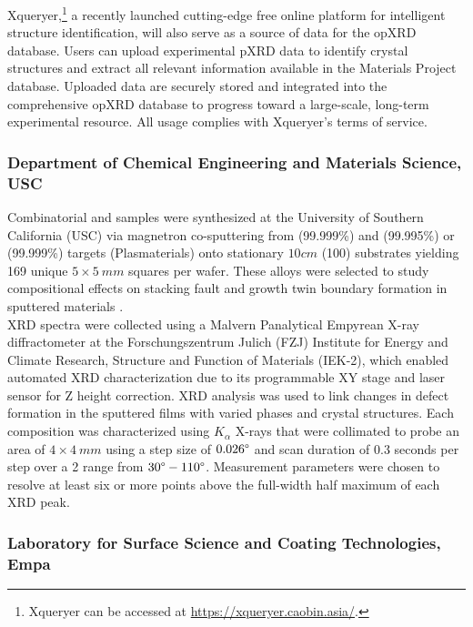 Xqueryer,\footnote{Xqueryer can be accessed at \url{https://xqueryer.caobin.asia/}.} a recently launched cutting-edge free online platform for intelligent structure identification, will also serve as a source of data for the opXRD database. Users can upload experimental pXRD data to identify crystal structures and extract all relevant information available in the Materials Project database\cite{jain2013commentary}. Uploaded data are securely stored and integrated into the comprehensive opXRD database to progress toward a large-scale, long-term experimental resource. All usage complies with Xqueryer's terms of service.


\subsubsection*{Department of Chemical Engineering and Materials Science, USC}

Combinatorial  and  samples were synthesized at the University of Southern California (USC) via magnetron co-sputtering from  (99.999\%) and  (99.995\%) or  (99.999\%) targets (Plasmaterials) onto stationary $10 \si{cm}$  (100) substrates yielding 169 unique $5 \times 5 \ \si{mm}$ squares per wafer. These alloys were selected to study compositional effects on stacking fault and growth twin boundary formation in sputtered materials \cite{alwen2024_1,alwen2024_2}. \\

XRD spectra were collected using a Malvern Panalytical Empyrean X-ray diffractometer at the Forschungszentrum Julich (FZJ) Institute for Energy and Climate Research, Structure and Function of Materials (IEK-2), which enabled automated XRD characterization due to its programmable XY stage and laser sensor for Z height correction. XRD analysis was used to link changes in defect formation in the sputtered films with varied phases and crystal structures. Each composition was characterized using  $K_\alpha$ X-rays that were collimated to probe an area of $4 \times 4 \ \si{mm}$ using a step size of $0.026\degree$ and scan duration of $0.3$ seconds per step over a 2 range from $30\degree - 110\degree$. Measurement parameters were chosen to resolve at least six or more points above the full-width half maximum of each XRD peak.

\subsubsection*{Laboratory for Surface Science and Coating Technologies, Empa}

